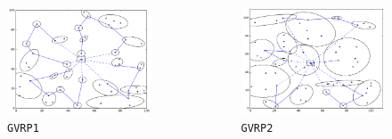 \documentclass[11pt]{beamer}
\begin{document}
\begin{frame}

\begin{columns}[t,onlytextwidth]

\begin{figure}
\centering
\includegraphics[width=\linewidth]{Images/GVRP_flow_n51_k25_m4_Q15_TL60_map.png}
\caption{\texttt{GVRP1}}
\end{figure}


\begin{figure}
\centering
\includegraphics[width=\linewidth]{Images/GVRP2_flow_n61_k17_m6_Q15_TL10_map.png}
\caption{\texttt{GVRP2}}
\end{figure}
\end{columns}


\end{frame}
\end{document}
